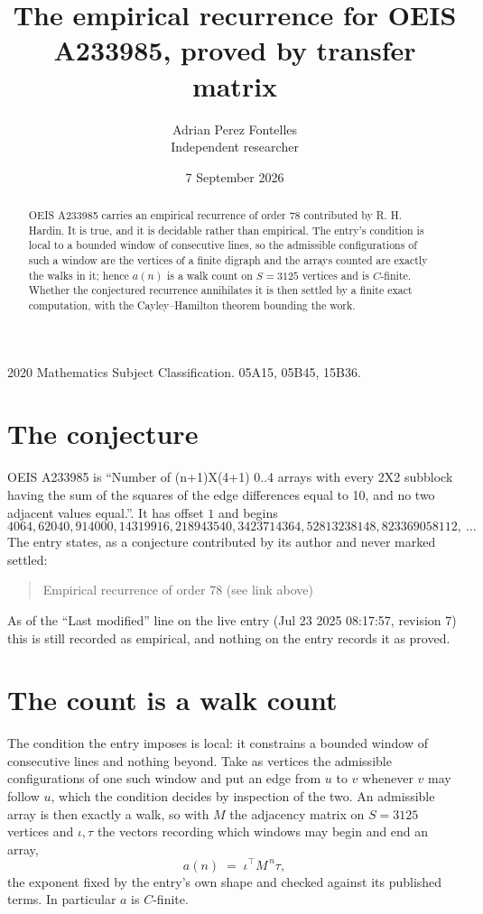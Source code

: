 \documentclass[11pt,a4paper]{article}
\title{The empirical recurrence for OEIS A233985, proved by transfer matrix}
\author{Adrian Perez Fontelles\\ \small Independent researcher}
\date{7 September 2026}
\theoremstyle{plain}
\theoremstyle{definition}
\begin{document}
\maketitle

\begin{abstract}
OEIS A233985 carries an empirical recurrence of order $78$ contributed by R. H. Hardin. It is
true, and it is decidable rather than empirical. The entry's condition is local to a bounded window of consecutive lines, so
the admissible configurations of such a window are the vertices of a finite digraph and the
arrays counted are exactly the walks in it; hence $a(n)$ is a walk count on $S=3125$ vertices
and is $C$-finite. Whether the conjectured recurrence annihilates it is then settled by a
finite exact computation, with the Cayley--Hamilton theorem bounding the work.
\end{abstract}

\noindent\small 2020 Mathematics Subject Classification. 05A15, 05B45, 15B36.\normalsize

\section{The conjecture}

OEIS A233985 is ``Number of (n+1)X(4+1) 0..4 arrays with every 2X2 subblock having the sum of the squares of the edge differences equal to 10, and no two adjacent values equal.''. It has offset $1$ and begins
\[
4064, 62040, 914000, 14319916, 218943540, 3423714364, 52813238148, 823369058112,\ \dots
\]
The entry states, as a conjecture contributed by its author and never marked settled:
\begin{quote}
Empirical recurrence of order 78 (see link above)
\end{quote}
As of the ``Last modified'' line on the live entry (Jul 23 2025 08:17:57, revision 7) this is still
recorded as empirical, and nothing on the entry records it as proved.

\section{The count is a walk count}

The condition the entry imposes is local: it constrains a bounded window of consecutive lines and nothing beyond. Take as
vertices the admissible configurations of one such window and put an edge from $u$ to $v$
whenever $v$ may follow $u$, which the condition decides by inspection of the two. An
admissible array is then exactly a walk, so with $M$ the adjacency matrix on $S=3125$ vertices
and $\iota,\tau$ the vectors recording which windows may begin and end an array,
\[
a(n)\;=\;\iota^{\!\top}M^{\,n}\tau ,
\]
the exponent fixed by the entry's own shape and checked against its published terms. In
particular $a$ is $C$-finite.
\end{document}
